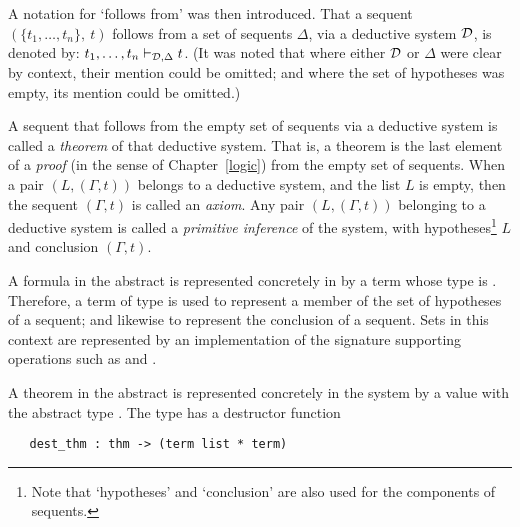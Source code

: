  A notation for `follows from' was then
introduced.  That a sequent $(\{t_1,\ldots,t_n\},\ t)$ follows from a
set of sequents $\Delta$, via a deductive system ${\cal D}$, is
denoted by: $t_1,\ldots,t_n\vdash_{{\cal D},\Delta} t$.  (It was noted
that where either ${\cal D}$ or $\Delta$ were clear by context, their
mention could be omitted; and where the set of hypotheses was empty,
its mention could be omitted.)

A sequent that follows from the empty set of sequents via a deductive
system is called a \textit{theorem} of that deductive system.  That
is, a theorem
%
%
is the last element of a \textit{proof}
%
%
(in the sense of Chapter~\ref{logic}) from the empty set
of sequents. When a pair $(L,(\Gamma,t))$ belongs to a deductive
system, and the list $L$ is empty, then the sequent $(\Gamma,t)$ is
called an \textit{axiom}.  Any pair
$(L,(\Gamma,t))$ belonging to a deductive system is called a
\textit{primitive inference} of the
system, with hypotheses\footnote{Note that `hypotheses' and
  `conclusion' are also used for the components of sequents.} $L$ and
conclusion $(\Gamma,t)$.

A formula
%
%
in the abstract is represented concretely in \HOL{} by a term whose
\HOL{} type is .  Therefore, a term
%
%
of type  is used to represent a member of the set of
hypotheses of a sequent; and likewise to represent the conclusion of a
sequent.  Sets in this context are represented by an implementation of
the \ML{} signature  supporting operations such as
 and .
%

A theorem in the abstract is represented concretely in the \HOL{}
system by a value with the \ML{} abstract type .
%
%
The type  has a destructor function

\begin{boxed}
\begin{verbatim}
   dest_thm : thm -> (term list * term)
\end{verbatim}
\end{boxed}

